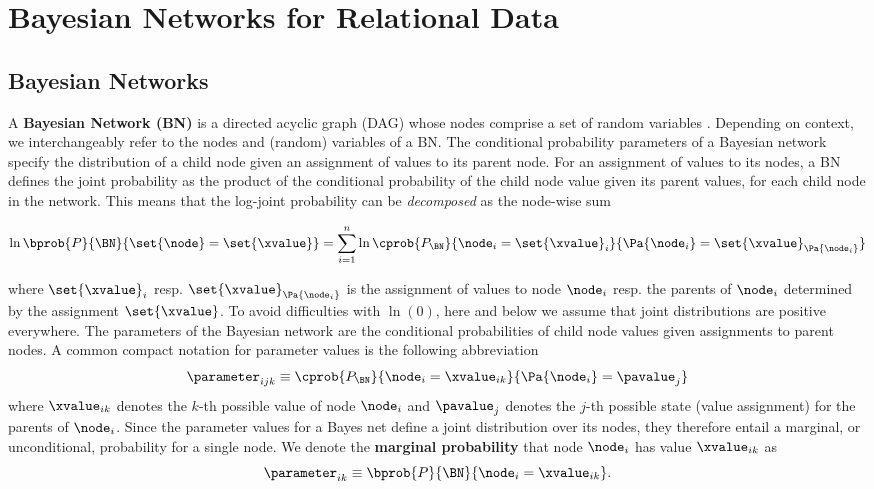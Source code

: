 \documentclass{article}
\begin{document}

\section{Bayesian Networks for Relational Data}

\subsection{Bayesian Networks}

A {\bf Bayesian Network (BN)} is a directed acyclic graph (DAG) whose nodes comprise a set of random variables \cite{Pearl1988}. Depending on context, we interchangeably refer to the nodes  and (random) variables of a BN. 
%
The conditional probability parameters of a Bayesian network specify the distribution of a child node given an assignment of values to its parent node. For an assignment of values to its nodes, a BN defines the joint probability as the product of the conditional probability of the child node value given its parent values, for each child node in the network. This means that the log-joint probability can be {\em decomposed} as the node-wise sum

\begin{equation} \label{eq:bn}
\ln \bprob{P}{\BN}{\set{\node} = \set{\xvalue}} = \sum_{i=1}^{n} \ln 
\cprob
{P_{\BN}}
{\node_{i} = \set{\xvalue}_{i}}
{
\Pa{\node_{i}} = \set{\xvalue}_{\Pa{\node_{i}}}
}
\end{equation}

where $\set{\xvalue}_{i}$ resp. $\set{\xvalue}_{\Pa{\node_{i}}}$ is the assignment of values to node $\node_{i}$ resp. the parents of $\node_{i}$ determined by the assignment $\set{\xvalue}$. 
To avoid difficulties with $\ln(0)$, here and below we assume that joint distributions are positive everywhere. The parameters of the Bayesian network are the conditional probabilities of child node values given assignments to parent nodes. A common compact notation for parameter values is the following abbreviation
$$
\parameter_{ijk} \equiv \cprob
{P_{\BN}}
{\node_{i} = \xvalue_{ik}}
{
\Pa{\node_{i}} = \pavalue_{j}
}
$$
where $\xvalue_{ik}$ denotes the $k$-th possible value of node $\node_{i}$ and $\pavalue_{j}$ denotes the $j$-th possible state (value assignment) for the parents of $\node_{i}$. 
%
Since the parameter values for a Bayes net define a joint distribution over its nodes, they therefore entail a marginal, or unconditional, probability for a single node. We denote the \textbf{marginal probability} that node $\node_{i}$ has value $\xvalue_{ik}$ as 
$$\parameter_{ik} \equiv \bprob{P}
{\BN}
{\node_{i} = \xvalue_{ik}}.
$$
\end{document}
